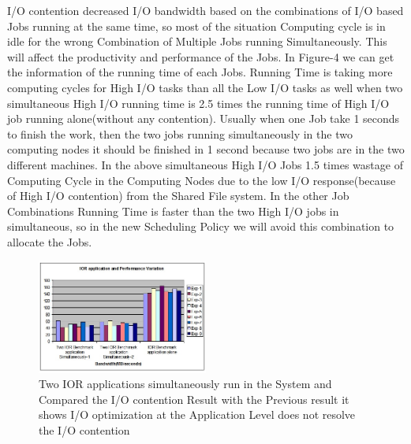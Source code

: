 \documentclass{article}
\begin{document}
I/O contention decreased I/O bandwidth based on the combinations of I/O based Jobs running at the same time, so most of the situation Computing cycle is in idle for the wrong Combination of Multiple Jobs running Simultaneously. This will affect the productivity and performance of the Jobs. In Figure-4 we can get the information of the running time of each Jobs. Running Time is taking more computing cycles for High I/O tasks than all the Low I/O tasks as well when two simultaneous High I/O running time is 2.5 times the running time of High I/O job running alone(without any contention). Usually when one Job take 1 seconds to finish the work, then the two jobs running simultaneously in the two computing nodes it should be finished in 1 second because two jobs are in the two different machines. In the above simultaneous High I/O Jobs 1.5 times wastage of Computing Cycle in the Computing Nodes due to the low I/O response(because of High I/O contention) from the Shared File system. In the other Job Combinations Running Time is faster than the two High I/O jobs in simultaneous, so in the new Scheduling Policy we will avoid this combination to allocate the Jobs.
\newline 
\begin{figure}
  \centering    
      \includegraphics[width=0.5\textwidth]{IOR-Application-Performance.jpg}
  \caption{Two IOR applications simultaneously run in the System and Compared the I/O contention Result with the Previous result it shows I/O optimization at the Application Level does not resolve the I/O contention}
\end{figure}
\end{document}
